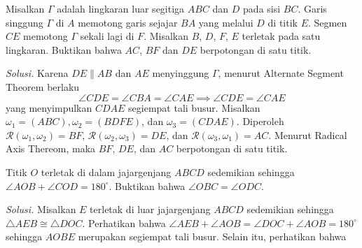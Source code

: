 \documentclass[12pt]{scrartcl}
\begin{document}
\newpage
\begin{tcolorbox}[title=\textbf{Soal 3: APMO 2020/1}]
Misalkan $\Gamma$ adalah lingkaran luar segitiga $ABC$ dan $D$ pada sisi $BC$. Garis singgung $\Gamma$ di $A$ memotong garis sejajar $BA$ yang melalui $D$ di titik $E$. Segmen $CE$ memotong $\Gamma$ sekali lagi di $F$. Misalkan $B$, $D$, $F$, $E$ terletak pada satu lingkaran. Buktikan bahwa $AC$, $BF$ dan $DE$ berpotongan di satu titik.
\end{tcolorbox}
\noindent\textit{Solusi.} Karena $DE\parallel AB$ dan $AE$ menyinggung $\Gamma$, menurut Alternate Segment Theorem berlaku
\[\angle CDE = \angle CBA =\angle CAE\implies \angle CDE=\angle CAE\]
yang menyimpulkan $CDAE$ segiempat tali busur. Misalkan $\omega_1=(ABC),\omega_2=(BDFE)$, dan $\omega_3=(CDAE)$. Diperoleh $\mathcal{R}(\omega_1,\omega_2) = BF$, $\mathcal{R}(\omega_2,\omega_3) =DE$, dan $\mathcal{R}(\omega_3,\omega_1)=AC$. Menurut Radical Axis Thereom, maka $BF$, $DE$, dan $AC$ berpotongan di satu titik.
\begin{center}
\end{center}
\newpage
\begin{tcolorbox}[title=\textbf{Soal 4: Canada 1997/4}]
Titik $O$ terletak di dalam jajargenjang $ABCD$ sedemikian sehingga $\angle AOB+\angle COD=180^\circ$. Buktikan bahwa $\angle OBC=\angle ODC$.
\end{tcolorbox}
\noindent\textit{Solusi.} Misalkan $E$ terletak di luar jajargenjang $ABCD$ sedemikian sehingga $\triangle AEB\cong \triangle DOC$. Perhatikan bahwa 
$\angle AEB+\angle AOB = \angle DOC + \angle AOB=180^\circ$ sehingga $AOBE$ merupakan segiempat tali busur. Selain itu, perhatikan bahwa
\end{document}

